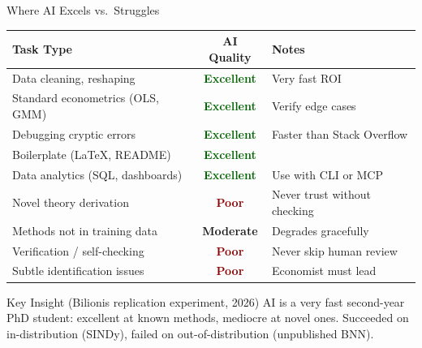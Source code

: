 \documentclass[aspectratio=169,10pt]{beamer}
\newcommand{\emphc}[1]{\textcolor{harvardcrimson}{#1}}
\begin{document}
\begin{frame}{Where AI Excels vs.\ Struggles}
\scriptsize
\begin{center}
\renewcommand{\arraystretch}{1.1}
\begin{tabular}{p{4.5cm} c p{4.5cm}}
\toprule
\textbf{Task Type} & \textbf{AI Quality} & \textbf{Notes} \\
\midrule
Data cleaning, reshaping & \textcolor{darkgreen}{\textbf{Excellent}} & Very fast ROI \\
Standard econometrics (OLS, GMM) & \textcolor{darkgreen}{\textbf{Excellent}} & Verify edge cases \\
Debugging cryptic errors & \textcolor{darkgreen}{\textbf{Excellent}} & Faster than Stack Overflow \\
Boilerplate (LaTeX, README) & \textcolor{darkgreen}{\textbf{Excellent}} & \\
Data analytics (SQL, dashboards) & \textcolor{darkgreen}{\textbf{Excellent}} & Use with CLI or MCP \\
\midrule
Novel theory derivation & \textcolor{darkred}{\textbf{Poor}} & Never trust without checking \\
Methods not in training data & \textcolor{softorange}{\textbf{Moderate}} & Degrades gracefully \\
Verification / self-checking & \textcolor{darkred}{\textbf{Poor}} & \emphc{Never skip human review} \\
Subtle identification issues & \textcolor{darkred}{\textbf{Poor}} & Economist must lead \\
\bottomrule
\end{tabular}
\end{center}

\vspace{0.2em}
\small
\begin{alertblock}{Key Insight (Bilionis replication experiment, 2026)}
\scriptsize
AI is a \emphc{very fast second-year PhD student}: excellent at known methods, mediocre at novel ones. Succeeded on in-distribution (SINDy), failed on out-of-distribution (unpublished BNN).
\end{alertblock}
\end{frame}
\end{document}
